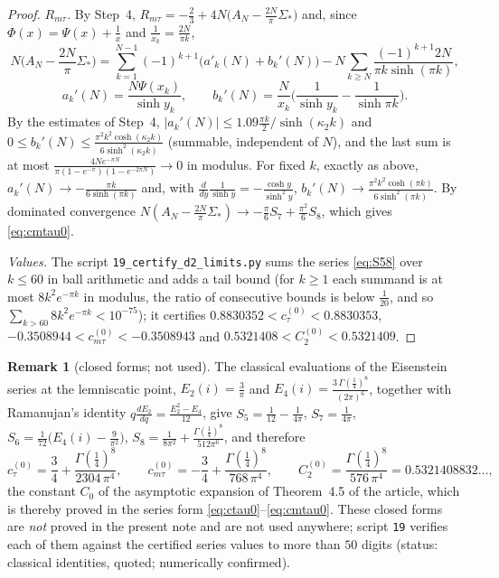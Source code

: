 \documentclass[11pt,a4paper]{article}
\theoremstyle{plain}
\theoremstyle{definition}
\newtheorem{remark}[theorem]{Remark}
\numberwithin{equation}{section}
\begin{document}
\begin{proof}
\emph{$R_{m\tau}$.} By Step~4, $R_{m\tau}=-\frac23+4N\big(A_N-\frac{2N}{\pi}\Sigma_*\big)$ and, since $\Phi(x)=\Psi(x)+\frac1x$ and $\frac1{x_k}=\frac{2N}{\pi k}$,
\[
N\Big(A_N-\frac{2N}\pi\Sigma_*\Big)=\sum_{k=1}^{N-1}(-1)^{k+1}\big(a'_k(N)+b_k'(N)\big)-N\sum_{k\ge N}\frac{(-1)^{k+1}2N}{\pi k\sinh(\pi k)},
\]
\[
a_k'(N)=\frac{N\Psi(x_k)}{\sinh y_k},\qquad b_k'(N)=\frac N{x_k}\Big(\frac1{\sinh y_k}-\frac1{\sinh\pi k}\Big).
\]
By the estimates of Step~4, $|a_k'(N)|\le1.09\frac{\pi k}{2}/\sinh(\kappa_2k)$ and $0\le b_k'(N)\le\frac{\pi^2k^2\cosh(\kappa_2k)}{6\sinh^2(\kappa_2k)}$ (summable, independent of $N$), and the last sum is at most $\frac{4Ne^{-\pi N}}{\pi(1-e^{-\pi})(1-e^{-2\pi N})}\to0$ in modulus. For fixed $k$, exactly as above, $a_k'(N)\to-\frac{\pi k}{6\sinh(\pi k)}$ and, with $\frac{d}{dy}\frac{1}{\sinh y}=-\frac{\cosh y}{\sinh^2y}$, $b_k'(N)\to\frac{\pi^2k^2\cosh(\pi k)}{6\sinh^2(\pi k)}$. By dominated convergence $N(A_N-\frac{2N}{\pi}\Sigma_*)\to-\frac\pi6S_7+\frac{\pi^2}6S_8$, which gives \eqref{eq:cmtau0}.

\emph{Values.} The script \texttt{19\_certify\_d2\_limits.py} sums the series \eqref{eq:S58} over $k\le60$ in ball arithmetic and adds a tail bound (for $k\ge1$ each summand is at most $8k^2e^{-\pi k}$ in modulus, the ratio of consecutive bounds is below $\frac1{20}$, and so $\sum_{k>60}8k^2e^{-\pi k}<10^{-75}$); it certifies $0.8830352<c^{(0)}_\tau<0.8830353$, $-0.3508944<c^{(0)}_{m\tau}<-0.3508943$ and $0.5321408<C_2^{(0)}<0.5321409$.
\end{proof}

\begin{remark}[closed forms; not used]\label{rem:d2closed}
The classical evaluations of the Eisenstein series at the lemniscatic point, $E_2(i)=\frac3\pi$ and $E_4(i)=\frac{3\,\Gamma(\frac14)^8}{(2\pi)^6}$, together with Ramanujan's identity $q\frac{dE_2}{dq}=\frac{E_2^2-E_4}{12}$, give
$S_5=\frac1{12}-\frac1{4\pi}$, $S_7=\frac1{4\pi}$, $S_6=\frac{1}{72}\big(E_4(i)-\frac9{\pi^2}\big)$, $S_8=\frac1{8\pi^2}+\frac{\Gamma(\frac14)^8}{512\pi^6}$, and therefore
\[
c^{(0)}_\tau=\frac34+\frac{\Gamma(\frac14)^8}{2304\,\pi^4},\qquad c^{(0)}_{m\tau}=-\frac34+\frac{\Gamma(\frac14)^8}{768\,\pi^4},\qquad C_2^{(0)}=\frac{\Gamma(\frac14)^8}{576\,\pi^4}=0.5321408832\ldots,
\]
the constant $C_0$ of the asymptotic expansion of Theorem~4.5 of the article, which is thereby proved in the series form \eqref{eq:ctau0}--\eqref{eq:cmtau0}. These closed forms are \emph{not} proved in the present note and are not used anywhere; script \texttt{19} verifies each of them against the certified series values to more than $50$ digits (status: classical identities, quoted; numerically confirmed).
\end{remark}
\end{document}
